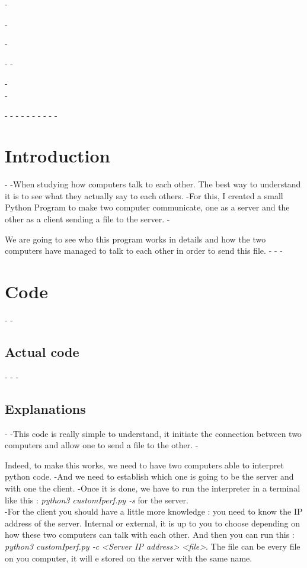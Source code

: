 -\documentclass[a4paper]{article}
\begin{document}
 -\maketitle
 -\begin{center}
 -\vspace{1cm}
 -\date{2017 March 4}
 -\vspace{2cm}\\
 -\end{center}    
 -    \thispagestyle{empty}
 -
 -\newpage{}
 -
 -\tableofcontents
 -\thispagestyle{empty}
 -
 -
 -\newpage
 -\section{Introduction}
 -
 -When studying how computers talk to each other. The best way to understand it is to see what they actually say to each others.
 -For this, I created a small Python Program to make two computer communicate, one as a server and the other as a client sending a file to the server.
 -\par We are going to see who this program works in details and how the two computers have managed to talk to each other in order to send this file.  
 -
 -\newpage
 -\section{Code}
 -
 -\subsection{Actual code}
 -
 -
 -\subsection{Explanations}
 -%
 -This code is really simple to understand, it initiate the connection between two computers and allow one to send a file to the other.
 -\par Indeed, to make this works, we need to have two computers able to interpret python code.
 -And we need to establish which one is going to be the server and with one the client.
 -Once it is done, we have to run the interpreter in a terminal like this : \textit{python3 customIperf.py -s} for the server.\\
 -For the client you should have a little more knowledge : you need to know the IP address of the server. Internal or external, it is up to you to choose depending on how these two computers can talk with each other. And then you can run this : \textit{python3 customIperf.py -c <Server IP address> <file>}. The file can be every file on you computer, it will e stored on the server with the same name.
\end{document}

